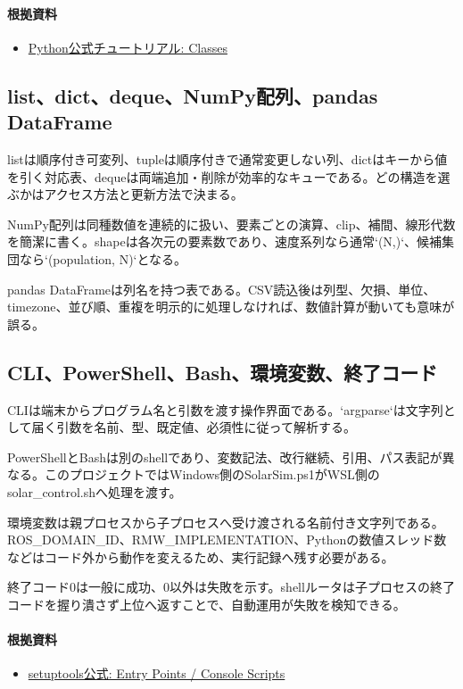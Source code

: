 \documentclass[a4paper,11pt]{article}
\begin{document}
\paragraph{根拠資料}
\begin{itemize}[leftmargin=1.6em]
\item \href{https://docs.python.org/3/tutorial/classes.html}{Python公式チュートリアル: Classes}
\end{itemize}

\subsection{list、dict、deque、NumPy配列、pandas DataFrame}
listは順序付き可変列、tupleは順序付きで通常変更しない列、dictはキーから値を引く対応表、dequeは両端追加・削除が効率的なキューである。どの構造を選ぶかはアクセス方法と更新方法で決まる。


NumPy配列は同種数値を連続的に扱い、要素ごとの演算、clip、補間、線形代数を簡潔に書く。shapeは各次元の要素数であり、速度系列なら通常`(N,)`、候補集団なら`(population, N)`となる。


pandas DataFrameは列名を持つ表である。CSV読込後は列型、欠損、単位、timezone、並び順、重複を明示的に処理しなければ、数値計算が動いても意味が誤る。



\subsection{CLI、PowerShell、Bash、環境変数、終了コード}
CLIは端末からプログラム名と引数を渡す操作界面である。`argparse`は文字列として届く引数を名前、型、既定値、必須性に従って解析する。


PowerShellとBashは別のshellであり、変数記法、改行継続、引用、パス表記が異なる。このプロジェクトではWindows側のSolarSim.ps1がWSL側のsolar\_control.shへ処理を渡す。


環境変数は親プロセスから子プロセスへ受け渡される名前付き文字列である。ROS\_DOMAIN\_ID、RMW\_IMPLEMENTATION、Pythonの数値スレッド数などはコード外から動作を変えるため、実行記録へ残す必要がある。


終了コード0は一般に成功、0以外は失敗を示す。shellルータは子プロセスの終了コードを握り潰さず上位へ返すことで、自動運用が失敗を検知できる。

\paragraph{根拠資料}
\begin{itemize}[leftmargin=1.6em]
\item \href{https://setuptools.pypa.io/en/latest/userguide/entry_point.html}{setuptools公式: Entry Points / Console Scripts}
\end{itemize}
\end{document}
